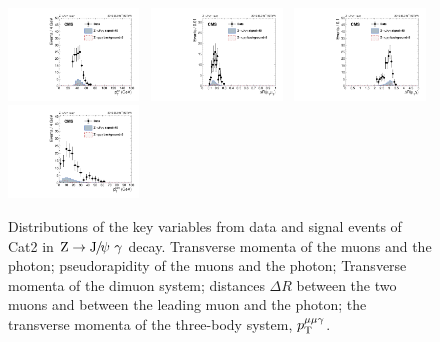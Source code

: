 \begin{figure}[h]
		  \includegraphics[width=0.31\textwidth]{Fig/Final_NoPreliminary/ZJpsiG/pTmumu_EBLR9}~
		  \includegraphics[width=0.31\textwidth]{Fig/Final_NoPreliminary/ZJpsiG/delR_Muons_EBLR9}~
		  \includegraphics[width=0.31\textwidth]{Fig/Final_NoPreliminary/ZJpsiG/delR_leMuPho_EBLR9}\\
		  \includegraphics[width=0.31\textwidth]{Fig/Final_NoPreliminary/ZJpsiG/pTmmg_EBLR9}\\
		
		  \caption{Distributions of the key variables from data and signal events of Cat2 in $\cPZ\to\JPsi\ \gamma$ decay.
		    Transverse momenta of the muons and the photon;
		    pseudorapidity of the muons and the photon;
		    Transverse momenta of the dimuon system;
		    distances $\Delta R$ between the two muons and between the leading muon and the photon;
		    the transverse momenta of the three-body system, $p_{\mathrm{T}}^{\mu\mu\gamma}$.}
		  \label{fig:dist-5}
		\end{figure}
		\clearpage
		
